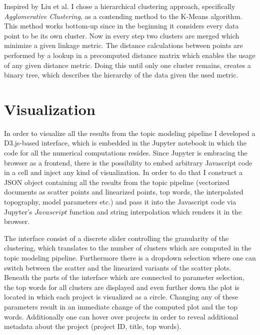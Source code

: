 Inspired by Liu et al. \cite{Liu:2018:INE:3219819.3220001} I chose a hierarchical clustering approach, specifically \textit{Agglomerative Clustering}, as a contending method to the K-Means algorithm. This method works bottom-up since in the beginning it considers every data point to be its own cluster. Now in every step two clusters are merged which minimize a given linkage metric. The distance calculations between points are performed by a lookup in a precomputed distance matrix which enables the usage of any given distance metric. Doing this until only one cluster remains, creates a binary tree, which describes the hierarchy of the data given the used metric. 

\section{Visualization}

In order to visualize all the results from the topic modeling pipeline I developed a D3.js-based interface, which is embedded in the Jupyter notebook in which the code for all the numerical computations resides. Since Jupyter is embracing the browser as a frontend, there is the possibility to embed arbitrary Javascript code in a cell and inject any kind of visualization. In order to do that I construct a JSON object containing all the results from the topic pipeline (vectorized documents as scatter points and linearized points, top words, the interpolated topography, model parameters etc.) and pass it into the Javascript code via Jupyter's $Javascript$ function and string interpolation which renders it in the browser.

The interface consist of a discrete slider controlling the granularity of the clustering, which translates to the number of clusters which are computed in the topic modeling pipeline. Furthermore there is a dropdown selection where one can switch between the scatter and the linearized variants of the scatter plots.
Beneath the parts of the interface which are connected to parameter selection, the top words for all clusters are displayed and even further down the plot is located in which each project is visualized as a circle. Changing any of these parameters result in an immediate change of the computed plot and the top words. Additionally one can hover over projects in order to reveal additional metadata about the project (project ID, title, top words).

